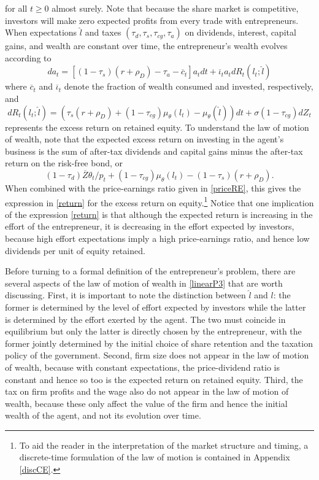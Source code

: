 \documentclass[11pt]{article}
\theoremstyle{plain}
\begin{document}
for all $t\geq0$ almost surely. Note that because the share market is competitive, investors will make zero expected profits from every trade with entrepreneurs. When expectations $\hat{l}$ and taxes $(\tau_d,\tau_s,\tau_{cg},\tau_a)$ on dividends, interest, capital gains, and wealth are constant over time, the entrepreneur's wealth evolves according to
\begin{equation}
da_t = [(1-\tau_s)(r + \rho_D) - \tau_a - \overline{c}_t]a_tdt + \overline{\iota}_t a_tdR_t(l_t;\hat{l})
\label{linearP3}
\end{equation}
where $\overline{c}_t$ and $\overline{\iota}_t$ denote the fraction of wealth consumed and invested, respectively, and 
\begin{equation}
dR_t(l_t;\hat{l}) = (\tau_s (r + \rho_D) + (1- \tau_{cg})\mu_{\theta}(l_t) - \mu_{\theta}(\hat{l}))dt + \sigma(1-\tau_{cg}) dZ_t
\label{return}
\end{equation}
represents the excess return on retained equity. To understand the law of motion of wealth, note that the expected excess return on investing in the agent's business is the sum of after-tax dividends and capital gains minus the after-tax return on the risk-free bond, or 
$$
(1 - \tau_d)\overline{Z}\theta_t/p_t + (1 - \tau_{cg})\mu_{\theta}(l_t) - (1 - \tau_s)(r + \rho_D).
$$
When combined with the price-earnings ratio given in \eqref{priceRE}, this gives the expression in \eqref{return} for the excess return on equity.\footnote{To aid the reader in the interpretation of the market structure and timing, a discrete-time formulation of the law of motion is contained in Appendix \ref{discCE}.} Notice that one implication of the expression \eqref{return} is that although the expected return is increasing in the effort of the entrepreneur, it is decreasing in the effort expected by investors, because high effort expectations imply a high price-earnings ratio, and hence low dividends per unit of equity retained. 


Before turning to a formal definition of the entrepreneur's problem, there are several aspects of the law of motion of wealth in \eqref{linearP3} that are worth discussing. First, it is important to note the distinction between $\hat{l}$ and $l$: the former is determined by the level of effort expected by investors while the latter is determined by the effort exerted by the agent. The two must coincide in equilibrium but only the latter is directly chosen by the entrepreneur, with the former jointly determined by the initial choice of share retention and the taxation policy of the government. Second, firm size does not appear in the law of motion of wealth, because with constant expectations, the price-dividend ratio is constant and hence so too is the expected return on retained equity. Third, the tax on firm profits and the wage also do not appear in the law of motion of wealth, because these only affect the value of the firm and hence the initial wealth of the agent, and not its evolution over time. 
\end{document}
